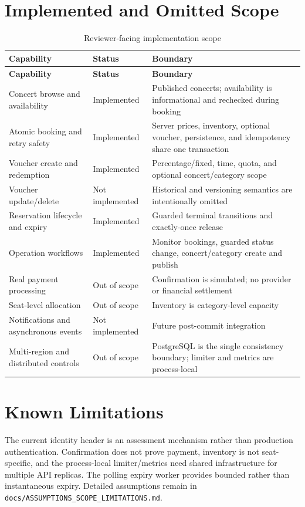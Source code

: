 \label{ch:payment-scope}
\section{Implemented and Omitted Scope}

\begingroup
\setlength{\tabcolsep}{3pt}
\scriptsize
\begin{longtable}{p{}p{}p{}}
\caption{Reviewer-facing implementation scope}\\
\toprule
\textbf{Capability} & \textbf{Status} & \textbf{Boundary} \\
\midrule
\endfirsthead
\toprule
\textbf{Capability} & \textbf{Status} & \textbf{Boundary} \\
\midrule
\endhead
Concert browse and availability & Implemented & Published concerts; availability is informational and rechecked during booking \\
Atomic booking and retry safety & Implemented & Server prices, inventory, optional voucher, persistence, and idempotency share one transaction \\
Voucher create and redemption & Implemented & Percentage/fixed, time, quota, and optional concert/category scope \\
Voucher update/delete & Not implemented & Historical and versioning semantics are intentionally omitted \\
Reservation lifecycle and expiry & Implemented & Guarded terminal transitions and exactly-once release \\
Operation workflows & Implemented & Monitor bookings, guarded status change, concert/category create and publish \\
Real payment processing & Out of scope & Confirmation is simulated; no provider or financial settlement \\
Seat-level allocation & Out of scope & Inventory is category-level capacity \\
Notifications and asynchronous events & Not implemented & Future post-commit integration \\
Multi-region and distributed controls & Out of scope & PostgreSQL is the single consistency boundary; limiter and metrics are process-local \\
\bottomrule
\end{longtable}
\endgroup

\section{Known Limitations}
The current identity header is an assessment mechanism rather than production
authentication. Confirmation does not prove payment, inventory is not
seat-specific, and the process-local limiter/metrics need shared infrastructure
for multiple API replicas. The polling expiry worker provides bounded rather
than instantaneous expiry. Detailed assumptions remain in
\nolinkurl{docs/ASSUMPTIONS_SCOPE_LIMITATIONS.md}.

